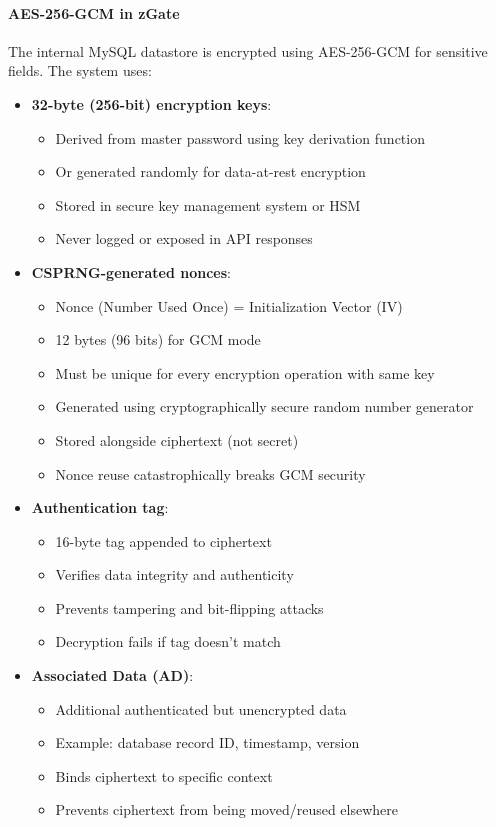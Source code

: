 \paragraph{AES-256-GCM in zGate}

The internal MySQL datastore is encrypted using AES-256-GCM for sensitive fields. The system uses:

\begin{itemize}
    \item \textbf{32-byte (256-bit) encryption keys}:
    \begin{itemize}
        \item Derived from master password using key derivation function
        \item Or generated randomly for data-at-rest encryption
        \item Stored in secure key management system or HSM
        \item Never logged or exposed in API responses
    \end{itemize}
    
    \item \textbf{CSPRNG-generated nonces}:
    \begin{itemize}
        \item Nonce (Number Used Once) = Initialization Vector (IV)
        \item 12 bytes (96 bits) for GCM mode
        \item Must be unique for every encryption operation with same key
        \item Generated using cryptographically secure random number generator
        \item Stored alongside ciphertext (not secret)
        \item Nonce reuse catastrophically breaks GCM security
    \end{itemize}
    
    \item \textbf{Authentication tag}:
    \begin{itemize}
        \item 16-byte tag appended to ciphertext
        \item Verifies data integrity and authenticity
        \item Prevents tampering and bit-flipping attacks
        \item Decryption fails if tag doesn't match
    \end{itemize}
    
    \item \textbf{Associated Data (AD)}:
    \begin{itemize}
        \item Additional authenticated but unencrypted data
        \item Example: database record ID, timestamp, version
        \item Binds ciphertext to specific context
        \item Prevents ciphertext from being moved/reused elsewhere
    \end{itemize}
    

\end{itemize}
